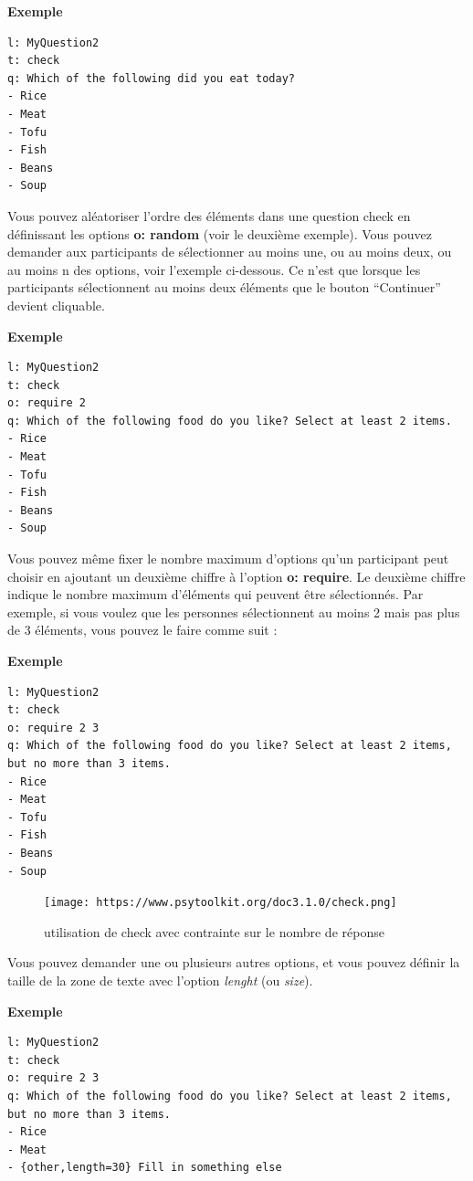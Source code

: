 \documentclass[
]{book}
\begin{document}
\textbf{Exemple}

\begin{verbatim}
l: MyQuestion2
t: check
q: Which of the following did you eat today?
- Rice
- Meat
- Tofu
- Fish
- Beans
- Soup
\end{verbatim}

Vous pouvez aléatoriser l'ordre des éléments dans une question check en
définissant les options \textbf{o: random} (voir le deuxième exemple).
Vous pouvez demander aux participants de sélectionner au moins une, ou
au moins deux, ou au moins n des options, voir l'exemple ci-dessous. Ce
n'est que lorsque les participants sélectionnent au moins deux éléments
que le bouton ``Continuer'' devient cliquable.

\textbf{Exemple}

\begin{verbatim}
l: MyQuestion2
t: check
o: require 2
q: Which of the following food do you like? Select at least 2 items.
- Rice
- Meat
- Tofu
- Fish
- Beans
- Soup
\end{verbatim}

Vous pouvez même fixer le nombre maximum d'options qu'un participant
peut choisir en ajoutant un deuxième chiffre à l'option \textbf{o:
require}. Le deuxième chiffre indique le nombre maximum d'éléments qui
peuvent être sélectionnés. Par exemple, si vous voulez que les personnes
sélectionnent au moins 2 mais pas plus de 3 éléments, vous pouvez le
faire comme suit :

\textbf{Exemple}

\begin{verbatim}
l: MyQuestion2
t: check
o: require 2 3
q: Which of the following food do you like? Select at least 2 items, but no more than 3 items.
- Rice
- Meat
- Tofu
- Fish
- Beans
- Soup
\end{verbatim}

\begin{figure}
\centering
\texttt{[image: https://www.psytoolkit.org/doc3.1.0/check.png]}
\caption{utilisation de check avec contrainte sur le nombre de réponse}
\end{figure}

Vous pouvez demander une ou plusieurs autres options, et vous pouvez
définir la taille de la zone de texte avec l'option \emph{lenght} (ou
\emph{size}).

\textbf{Exemple}

\begin{verbatim}
l: MyQuestion2
t: check
o: require 2 3
q: Which of the following food do you like? Select at least 2 items, but no more than 3 items.
- Rice
- Meat
- {other,length=30} Fill in something else
\end{verbatim}
\end{document}
